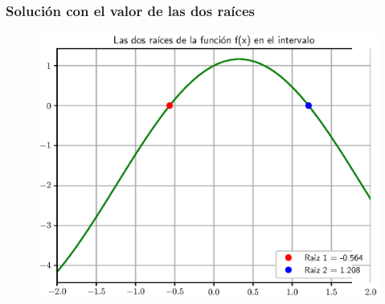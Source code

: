 \documentclass[12pt]{beamer}
\begin{document}
\begin{frame}
\frametitle{Solución con el valor de las dos raíces}
\begin{figure}
	\centering
    \includegraphics[scale=0.55]{Imagenes/raices_03_MNR_04.eps}
\end{figure}
\end{frame}
\end{document}
